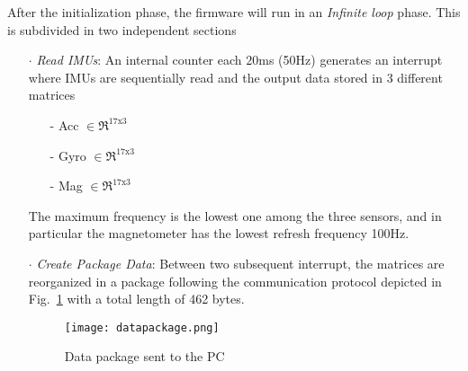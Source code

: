 After the initialization phase, the firmware will run in an \textit{Infinite loop} phase. This is subdivided in two independent sections
\begin{enumerate}
\item[$\cdot$] \textit{Read IMUs}: An internal counter each $20$ms (50Hz) generates an interrupt where IMUs are sequentially read and the output data stored in 3 different matrices
                          \begin{enumerate}
                          \item[-] Acc $\in \Re ^{17 \text{x} 3}$
                          \item[-] Gyro $\in \Re ^{17 \text{x} 3}$
                          \item[-] Mag $\in \Re ^{17 \text{x} 3}$
                          \end{enumerate}
                          The maximum frequency is the lowest one among the three sensors, and in particular the magnetometer has the lowest refresh frequency 100Hz.
\item[$\cdot$] \textit{Create Package Data}:  Between two subsequent interrupt, the matrices are reorganized in a package following the communication protocol depicted in Fig.~\ref{fig:package} with a total length of 462 bytes.

\begin{figure}[h]
\centering
\texttt{[image: datapackage.png]}
\caption{Data package sent to  the PC}
\label{fig:package}
\end{figure}



\end{enumerate}

